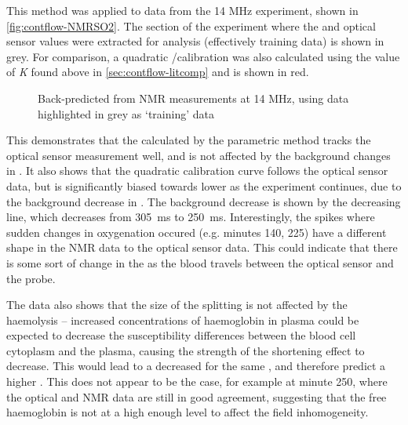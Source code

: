This method was applied to data from the 14 MHz experiment, shown in \autoref{fig:contflow-NMRSO2}.
The section of the experiment where the \Ttwo and optical sensor \SOtwo values were extracted for analysis (effectively training data) is shown in grey.
For comparison, a quadratic \Rtwo/\SOtwo calibration was also calculated using the value of \textit{K} found above in \autoref{sec:contflow-litcomp} and is shown in red.

\begin{figure}[t]
\centering
{}
\caption[Back-predicted \SOtwo from NMR measurements at 14 MHz]{Back-predicted \SOtwo from NMR measurements at 14 MHz, using data highlighted in grey as `training' data}
\label{fig:contflow-NMRSO2}
\end{figure}

This demonstrates that the \SOtwo calculated by the parametric method tracks the optical sensor measurement well, and is not affected by the background changes in \Ttwo.
It also shows that the quadratic calibration curve follows the optical sensor data, but is significantly biased towards lower \SOtwo as the experiment continues, due to the background decrease in \Ttwo.
The background decrease is shown by the decreasing \TtwoO line, which decreases from \SI{305}{ms} to \SI{250}{ms}.
Interestingly, the spikes where sudden changes in oxygenation occured (e.g. minutes 140, 225) have a different shape in the NMR data to the optical sensor data.
This could indicate that there is some sort of change in the \SOtwo as the blood travels between the optical sensor and the probe.

The data also shows that the size of the splitting is not affected by the haemolysis -- increased concentrations of haemoglobin in plasma could be expected to decrease the susceptibility differences between the blood cell cytoplasm and the plasma, causing the strength of the \Ttwo shortening effect to decrease.
This would lead to a decreased \Kzero for the same \SOtwo, and therefore predict a higher \SOtwo.
This does not appear to be the case, for example at minute 250, where the optical and NMR data are still in good agreement, suggesting that the free haemoglobin is not at a high enough level to affect the field inhomogeneity.

